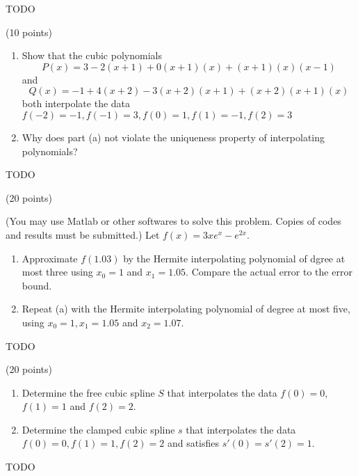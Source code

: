 \documentclass[10pt]{jhwhw}
\begin{document}
\solution

	TODO

\problem{} (10 points)

	\begin{enumerate}
		\item Show that the cubic polynomials
			$$
				P(x) = 3 - 2(x+1) + 0(x+1)(x) + (x+1)(x)(x-1)
			$$
			and
			$$
				Q(x) = -1 + 4(x+2) - 3(x+2)(x+1) + (x+2)(x+1)(x)
			$$
			both interpolate the data
			$f(-2) = -1, f(-1) = 3, f(0) = 1, f(1) = -1, f(2) = 3$
		\item Why does part (a) not violate the uniqueness property of interpolating 
			polynomials?
	\end{enumerate}

\solution

	TODO

\problem{} (20 points)

	(You may use Matlab or other softwares to solve this problem. Copies of codes and results
	must be submitted.)
	Let $f(x) = 3xe^x - e^{2x}$.
	\begin{enumerate}
		\item Approximate $f(1.03)$ by the Hermite interpolating polynomial of dgree at most
			three using $x_0 = 1$ and $x_1 = 1.05$. Compare the actual error to the error bound.
		\item Repeat (a) with the Hermite interpolating polynomial of degree at most five,
			using $x_0=1, x_1=1.05$ and $x_2 = 1.07$.
	\end{enumerate}

\solution

	TODO

\problem{} (20 points)

	\begin{enumerate}
		\item Determine the free cubic spline $S$ that interpolates the data $f(0) = 0,$
			$f(1) =1$ and $f(2)=2$.
		\item Determine the clamped cubic spline $s$ that interpolates the data
			$f(0) = 0, f(1) = 1, f(2) = 2$ and satisfies $s'(0) = s'(2) = 1$.
	\end{enumerate}

\solution

	TODO
\end{document}
